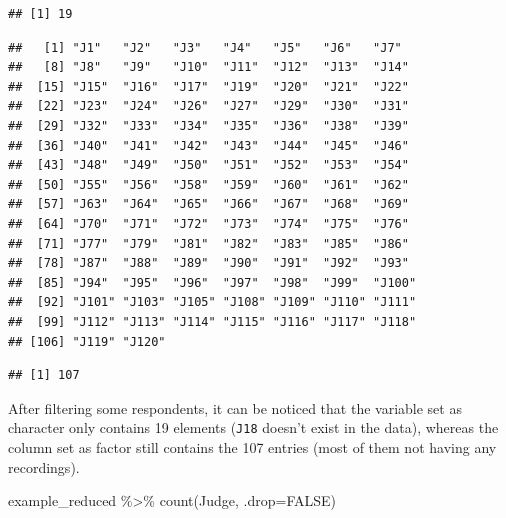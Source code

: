 \documentclass[
]{krantz}
\makeatletter
\newenvironment{Shaded}{\begin{snugshade}}{\end{snugshade}}
\newcommand{\AttributeTok}[1]{\textcolor[rgb]{0.61,0.61,0.61}{#1}}
\newcommand{\ConstantTok}[1]{\textcolor[rgb]{0,0,0}{#1}}
\newcommand{\FunctionTok}[1]{\textcolor[rgb]{0,0,0}{#1}}
\newcommand{\NormalTok}[1]{#1}
\newcommand{\SpecialCharTok}[1]{\textcolor[rgb]{0,0,0}{#1}}
\newenvironment{kframe}{%
\medskip{}
\setlength{\fboxsep}{.8em}
 \def\at@end@of@kframe{}%
 \ifinner\ifhmode%
  \def\at@end@of@kframe{\end{minipage}}%
  \begin{minipage}{\columnwidth}%
 \fi\fi%
 \def\FrameCommand##1{\hskip\@totalleftmargin \hskip-\fboxsep
 \colorbox{shadecolor}{##1}\hskip-\fboxsep
     \hskip-\linewidth \hskip-\@totalleftmargin \hskip\columnwidth}%
 \MakeFramed {\advance\hsize-\width
   \@totalleftmargin\z@ \linewidth\hsize
   \@setminipage}}%
 {\par\unskip\endMakeFramed%
 \at@end@of@kframe}
\renewenvironment{Shaded}{\begin{kframe}}{\end{kframe}}
\makeatother
\begin{document}
\begin{verbatim}
## [1] 19
\end{verbatim}

\begin{Shaded}
\end{Shaded}

\begin{verbatim}
##   [1] "J1"   "J2"   "J3"   "J4"   "J5"   "J6"   "J7"  
##   [8] "J8"   "J9"   "J10"  "J11"  "J12"  "J13"  "J14" 
##  [15] "J15"  "J16"  "J17"  "J19"  "J20"  "J21"  "J22" 
##  [22] "J23"  "J24"  "J26"  "J27"  "J29"  "J30"  "J31" 
##  [29] "J32"  "J33"  "J34"  "J35"  "J36"  "J38"  "J39" 
##  [36] "J40"  "J41"  "J42"  "J43"  "J44"  "J45"  "J46" 
##  [43] "J48"  "J49"  "J50"  "J51"  "J52"  "J53"  "J54" 
##  [50] "J55"  "J56"  "J58"  "J59"  "J60"  "J61"  "J62" 
##  [57] "J63"  "J64"  "J65"  "J66"  "J67"  "J68"  "J69" 
##  [64] "J70"  "J71"  "J72"  "J73"  "J74"  "J75"  "J76" 
##  [71] "J77"  "J79"  "J81"  "J82"  "J83"  "J85"  "J86" 
##  [78] "J87"  "J88"  "J89"  "J90"  "J91"  "J92"  "J93" 
##  [85] "J94"  "J95"  "J96"  "J97"  "J98"  "J99"  "J100"
##  [92] "J101" "J103" "J105" "J108" "J109" "J110" "J111"
##  [99] "J112" "J113" "J114" "J115" "J116" "J117" "J118"
## [106] "J119" "J120"
\end{verbatim}

\begin{Shaded}
\end{Shaded}

\begin{verbatim}
## [1] 107
\end{verbatim}

After filtering some respondents, it can be noticed that the variable set as character only contains 19 elements (\texttt{J18} doesn't exist in the data), whereas the column set as factor still contains the 107 entries (most of them not having any recordings).

\begin{Shaded}
\begin{Highlighting}[]
\NormalTok{example\_reduced }\SpecialCharTok{\%\textgreater{}\%} 
  \FunctionTok{count}\NormalTok{(Judge, }\AttributeTok{.drop=}\ConstantTok{FALSE}\NormalTok{)}
\end{Highlighting}
\end{Shaded}
\end{document}
